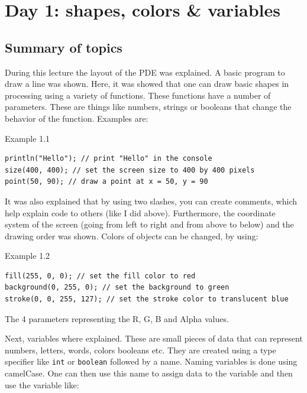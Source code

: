 \chapter{Day 1: shapes, colors \& variables}

\section{Summary of topics}
During this lecture the layout of the PDE was explained. A basic program to draw a line was shown. Here, it was showed that one can draw basic shapes in processing using a variety of functions. These functions have a number of parameters. These are things like numbers, strings or booleans that change the behavior of the function. Examples are:

\begin{codebox}{Example 1.1}
    \begin{lstlisting}
println("Hello"); // print "Hello" in the console
size(400, 400); // set the screen size to 400 by 400 pixels
point(50, 90); // draw a point at x = 50, y = 90
    \end{lstlisting}
\end{codebox}

It was also explained that by using two slashes, you can create comments, which help explain code to others (like I did above). Furthermore, the coordinate system of the screen (going from left to right and from above to below) and the drawing order was shown. Colors of objects can be changed, by using:

\begin{codebox}{Example 1.2}
    \begin{lstlisting}
fill(255, 0, 0); // set the fill color to red
background(0, 255, 0); // set the background to green
stroke(0, 0, 255, 127); // set the stroke color to translucent blue
    \end{lstlisting}
\end{codebox}

The 4 parameters representing the R, G, B and Alpha values.

Next, variables where explained. These are small pieces of data that can represent numbers, letters, words, colors booleans etc. They are created using a type specifier like \texttt{int} or \texttt{boolean} followed by a name. Naming variables is done using camelCase. One can then use this name to assign data to the variable and then use the variable like:

